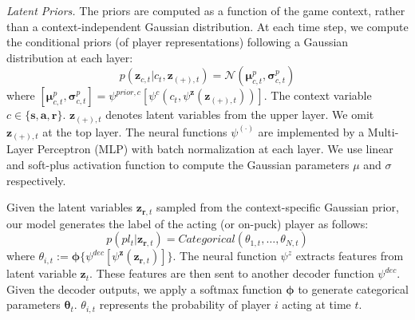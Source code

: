 \documentclass[letterpaper]{article} %
\newcommand{\context}{c}
\newcommand{\latentvariables}{\mathbf{z}}
\newcommand{\state}{\mathbf{s}}
\newcommand{\action}{\mathbf{a}}
\newcommand{\reward}{\boldsymbol{r}}
\newcommand{\player}{pl}
\newcommand{\pindex}{i}
\newcommand{\softmax}{\boldsymbol{\phi}}
\newcommand{\BernoulliParameters}{\theta}
\begin{document}
{\em Latent Priors.}  The priors are computed as a function of the game context, rather than a context-independent Gaussian distribution. At each time step, we compute the conditional priors (of player representations) following a Gaussian distribution at each layer:
\begin{equation}
    p(\latentvariables_{\context,t}|\context_{t},\latentvariables_{(+),t})=\mathcal{N}(\boldsymbol{\mu}^{p}_{\context,t},\boldsymbol{\sigma}^{p}_{\context,t}) 
\end{equation}
 where $[\boldsymbol{\mu}^{p}_{\context,t},\boldsymbol{\sigma}^{p}_{\context,t}]=\psi^{prior,\context}[\psi^{\context}(\context_{t}, \psi^{\latentvariables}(\latentvariables_{(+),t}))]$.
The context variable $\context\in\{\state,\action,\reward\}$. $\latentvariables_{(+),t}$ denotes latent variables from the upper layer. We omit $\latentvariables_{(+),t}$ at the top layer.
The neural functions $\psi^{(\cdot)}$ are implemented by a Multi-Layer Perceptron (MLP) with batch normalization at each layer. We use linear and soft-plus activation function to compute the Gaussian parameters $\mu$ and $\sigma$ respectively.

Given the latent variables $\latentvariables_{\reward,t}$ sampled from the context-specific Gaussian prior, %
our model generates the label of the acting (or on-puck) player as follows:
\begin{equation}
    p(\player_{t}| \latentvariables_{\reward,t})=Categorical(\BernoulliParameters_{1,t},\dots,\BernoulliParameters_{N,t})
\end{equation}
where $\BernoulliParameters_{\pindex,t}:=\softmax\{\psi^{dec}[\psi^{\latentvariables}(\latentvariables_{\reward,t})]\}$.
The neural function $\psi^{z}$ extracts features from latent variable $\latentvariables_{t}$. These features are then sent to another decoder function $\psi^{dec}$. Given the decoder outputs, we apply a softmax function $\softmax$ to generate categorical parameters $\boldsymbol{\BernoulliParameters}_{t}$. $\BernoulliParameters_{\pindex,t}$ represents the probability of player $\pindex$ acting at time $t$. 
\end{document}
